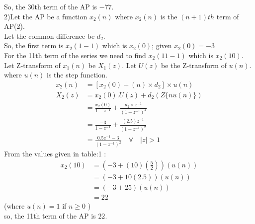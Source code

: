 \documentclass[journal,12pt,twocolumn]{IEEEtran}
\theoremstyle{remark}
\begin{document}
So, the 30th term of the AP is $-77$.\\

2)Let the AP be a function $x_2(n)$ where $x_2(n)$ is the $(n+1)th$ term of AP(2).\\
Let the common difference be $d_2$.\\
So, the first term is $x_2(1-1)$ which is $x_2(0)$; given $x_2(0) = -3$\\ 
For the 11th term of the series we need to find $x_2(11-1)$ which is $x_2(10)$.\\
Let Z-transform of $x_1(n)$ be $X_1(z)$. Let $U(z)$ be the Z-transform of $u(n)$.\\
where \(u(n)\) is the step function.
\begin{align}
x_2(n) &= [x_2(0) + (n) \times d_2 ]\times u(n)\\
X_2(z) &= x_2(0).U(z) + d_2(Z\{nu(n)\})\\
       &= \frac{x_2(0)}{1-z^{-1}} + \frac{d_2\times z^{-1}}{(1-z^{-1})^2}\\
       &= \frac{-3}{1-z^{-1}} + \frac{(2.5)z^{-1}}{(1-z^{-1})^2}\\
       &= \frac{0.5z^{-1}-3}{(1-z^{-1})^2} \quad \forall \quad |z| > 1
\end{align}
From the values given in table:1 :
\begin{align}
x_2(10) &= (-3 + (10)\left(\frac{5}{2}\right))(u(n))\\
&= (-3 + 10(2.5))(u(n))\\
& = (-3 + 25)(u(n)) \\
&= 22
\end{align}
(where $u(n) = 1$ if $n \geq 0$ )\\

so, the 11th term of the AP is $22$.
\end{document}
